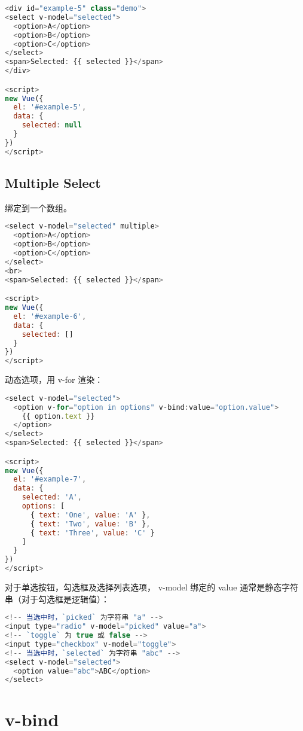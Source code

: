 \begin{lstlisting}[language=JavaScript]
<div id="example-5" class="demo">
<select v-model="selected">
  <option>A</option> 
  <option>B</option> 
  <option>C</option>
</select> 
<span>Selected: {{ selected }}</span>
</div>

<script>
new Vue({
  el: '#example-5',
  data: {
    selected: null
  }
})
</script>
\end{lstlisting}


\subsection{Multiple Select}


绑定到一个数组。



\begin{lstlisting}[language=JavaScript]
<select v-model="selected" multiple>
  <option>A</option>
  <option>B</option>
  <option>C</option>
</select>
<br>
<span>Selected: {{ selected }}</span>

<script>
new Vue({
  el: '#example-6',
  data: {
    selected: []
  }
})
</script>
\end{lstlisting}

动态选项，用 v-for 渲染：


\begin{lstlisting}[language=JavaScript]
<select v-model="selected">
  <option v-for="option in options" v-bind:value="option.value">
    {{ option.text }}
  </option>
</select>
<span>Selected: {{ selected }}</span>

<script>
new Vue({
  el: '#example-7',
  data: {
    selected: 'A',
    options: [
      { text: 'One', value: 'A' },
      { text: 'Two', value: 'B' },
      { text: 'Three', value: 'C' }
    ]
  }
})
</script>
\end{lstlisting}

对于单选按钮，勾选框及选择列表选项， v-model 绑定的 value 通常是静态字符串（对于勾选框是逻辑值）：


\begin{lstlisting}[language=JavaScript]
<!-- 当选中时，`picked` 为字符串 "a" -->
<input type="radio" v-model="picked" value="a">
<!-- `toggle` 为 true 或 false -->
<input type="checkbox" v-model="toggle">
<!-- 当选中时，`selected` 为字符串 "abc" -->
<select v-model="selected">
  <option value="abc">ABC</option>
</select>
\end{lstlisting}

\section{v-bind}


